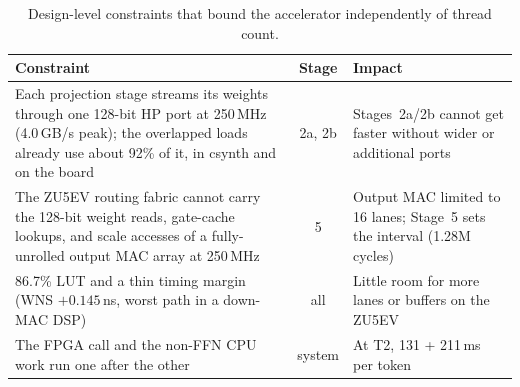 \begin{table}[H]
\centering
\footnotesize
\caption{Design-level constraints that bound the accelerator independently of thread
count.}
\label{tab:design_constraints}
\setlength{\tabcolsep}{5pt}
\begin{tabular}{p{8.3cm} c p{5.4cm}}
\hline
\textbf{Constraint} & \textbf{Stage} & \textbf{Impact} \\
\hline
Each projection stage streams its weights through one 128-bit HP port at 250\,MHz
(4.0\,GB/s peak); the overlapped loads already use about 92\% of it, in csynth and on
the board & 2a, 2b &
Stages~2a/2b cannot get faster without wider or additional ports \\
\hline
The ZU5EV routing fabric cannot carry the 128-bit weight reads, gate-cache lookups, and
scale accesses of a fully-unrolled output MAC array at 250\,MHz & 5 & Output MAC limited
to 16 lanes; Stage~5 sets the interval (1.28M cycles) \\
\hline
86.7\% LUT and a thin timing margin (WNS $+0.145$\,ns, worst path in a down-MAC DSP)
& all & Little room for more lanes or buffers on the ZU5EV \\
\hline
The FPGA call and the non-FFN CPU work run one after the other & system & At T2, 131 +
211\,ms per token \\
\hline
\end{tabular}
\end{table}
